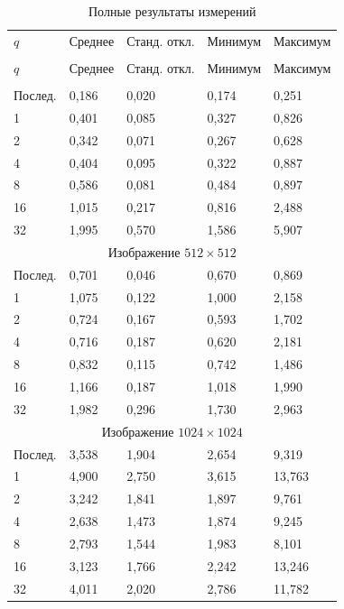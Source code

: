 \begin{longtable}{|p{23mm}|p{29mm}|p{26mm}|p{26mm}|p{26mm}|}
\caption{Полные результаты измерений}\label{tab:all}\\\hline
$q$ & Среднее & Станд. откл. & Минимум & Максимум\\\hhline{|=:=:=:=:=|}
\endfirsthead
\multicolumn{5}{l}{Продолжение таблицы~\thetable}\\\hline
$q$ & Среднее & Станд. откл. & Минимум & Максимум\\\hhline{|=:=:=:=:=|}
\endhead
\multicolumn{5}{|c|}{Изображение $256 \times 256$}\\\hline
Послед. & 0,186 & 0,020 & 0,174 & 0,251 \\\hline
1 & 0,401 & 0,085 & 0,327 & 0,826 \\\hline
2 & 0,342 & 0,071 & 0,267 & 0,628 \\\hline
4 & 0,404 & 0,095 & 0,322 & 0,887 \\\hline
8 & 0,586 & 0,081 & 0,484 & 0,897 \\\hline
16 & 1,015 & 0,217 & 0,816 & 2,488 \\\hline
32 & 1,995 & 0,570 & 1,586 & 5,907 \\\hline
\multicolumn{5}{|c|}{Изображение $512 \times 512$}\\\hline
Послед. & 0,701 & 0,046 & 0,670 & 0,869 \\\hline
1 & 1,075 & 0,122 & 1,000 & 2,158 \\\hline
2 & 0,724 & 0,167 & 0,593 & 1,702 \\\hline
4 & 0,716 & 0,187 & 0,620 & 2,181 \\\hline
8 & 0,832 & 0,115 & 0,742 & 1,486 \\\hline
16 & 1,166 & 0,187 & 1,018 & 1,990 \\\hline
32 & 1,982 & 0,296 & 1,730 & 2,963 \\\hline
\multicolumn{5}{|c|}{Изображение $1024 \times 1024$}\\\hline
Послед. & 3,538 & 1,904 & 2,654 & 9,319 \\\hline
1 & 4,900 & 2,750 & 3,615 & 13,763 \\\hline
2 & 3,242 & 1,841 & 1,897 & 9,761 \\\hline
4 & 2,638 & 1,473 & 1,874 & 9,245 \\\hline
8 & 2,793 & 1,544 & 1,983 & 8,101 \\\hline
16 & 3,123 & 1,766 & 2,242 & 13,246 \\\hline
32 & 4,011 & 2,020 & 2,786 & 11,782 \\\hline

\end{longtable}
